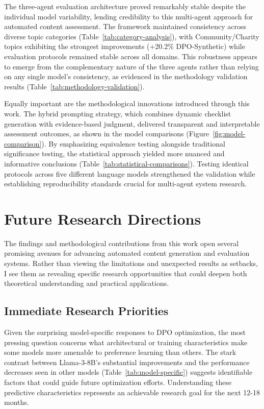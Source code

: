 The three-agent evaluation architecture proved remarkably stable despite the individual model variability, lending credibility to this multi-agent approach for automated content assessment. The framework maintained consistency across diverse topic categories (Table~\ref{tab:category-analysis}), with Community/Charity topics exhibiting the strongest improvements (+20.2\% DPO-Synthetic) while evaluation protocols remained stable across all domains. This robustness appears to emerge from the complementary nature of the three agents rather than relying on any single model's consistency, as evidenced in the methodology validation results (Table~\ref{tab:methodology-validation}).

Equally important are the methodological innovations introduced through this work. The hybrid prompting strategy, which combines dynamic checklist generation with evidence-based judgment, delivered transparent and interpretable assessment outcomes, as shown in the model comparisons (Figure~\ref{fig:model-comparison}). By emphasizing equivalence testing alongside traditional significance testing, the statistical approach yielded more nuanced and informative conclusions (Table~\ref{tab:statistical-comparisons}). Testing identical protocols across five different language models strengthened the validation while establishing reproducibility standards crucial for multi-agent system research.



\section{Future Research Directions}
\label{sec:future-directions}

The findings and methodological contributions from this work open several promising avenues for advancing automated content generation and evaluation systems. Rather than viewing the limitations and unexpected results as setbacks, I see them as revealing specific research opportunities that could deepen both theoretical understanding and practical applications.

\subsection{Immediate Research Priorities}

Given the surprising model-specific responses to DPO optimization, the most pressing question concerns what architectural or training characteristics make some models more amenable to preference learning than others. The stark contrast between Llama-3-8B's substantial improvements and the performance decreases seen in other models (Table~\ref{tab:model-specific}) suggests identifiable factors that could guide future optimization efforts. Understanding these predictive characteristics represents an achievable research goal for the next 12-18 months.


